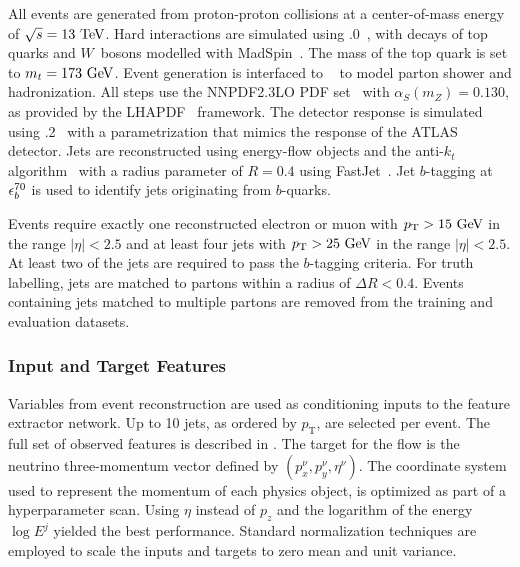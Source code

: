 All events are generated from proton-proton collisions at a center-of-mass energy of $\sqrt{s} = 13~\TeV$.
Hard interactions are simulated using .0~\cite{MadGraph}, with decays of top quarks and $W$~bosons modelled with MadSpin~\cite{MadSpin}.
The mass of the top quark is set to $m_t = 173~\GeV$.
Event generation is interfaced to ~\cite{Pythia8} to model parton shower and hadronization.
All steps use the \textsc{NNPDF2.3LO} PDF set~\cite{PDF2.3} with $\alpha_S(m_Z) = 0.130$, as provided by the LHAPDF~\cite{LHAPDF6PartonDensity} framework.
The detector response is simulated using .2~\cite{Delphes} with a parametrization that mimics the response of the ATLAS detector.
Jets are reconstructed using energy-flow objects and the anti-$k_t$ algorithm~\cite{AntiKt} with a radius parameter of $R = 0.4$ using FastJet~\cite{FastJet}.
Jet $b$-tagging at $\epsilon_b^{70}$ is used to identify jets originating from $b$-quarks.

Events require exactly one reconstructed electron or muon with $p_\mathrm{T} > 15~\GeV$ in the range $|\eta|<2.5$ and at least four jets with $\pt > 25~\GeV$ in the range $|\eta|<2.5$.
At least two of the jets are required to pass the $b$-tagging criteria.
For truth labelling, jets are matched to partons within a radius of $\Delta R < 0.4$.
Events containing jets matched to multiple partons are removed from the training and evaluation datasets.

\subsubsection{Input and Target Features}

Variables from event reconstruction are used as conditioning inputs to the feature extractor network.
Up to 10 jets, as ordered by $p_\mathrm{T}$, are selected per event.
The full set of observed features is described in .
The target for the flow is the neutrino three-momentum vector defined by $(p_x^\nu, p_y^\nu, \eta^\nu )$.
The coordinate system used to represent the momentum of each physics object, is optimized as part of a hyperparameter scan.
Using $\eta$ instead of $p_z$ and the logarithm of the energy $\log E^j$ yielded the best performance.
Standard normalization techniques are employed to scale the inputs and targets to zero mean and unit variance.

